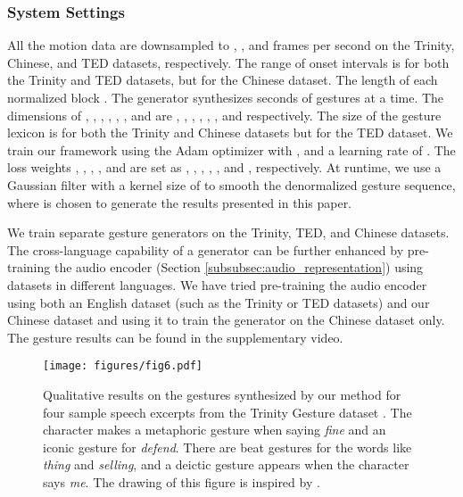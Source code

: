 \documentclass[acmtog,authorversion]{acmart}
\begin{document}
\subsubsection{System Settings}
All the motion data are downsampled to , , and  frames per second on the Trinity, Chinese, and TED datasets, respectively. The range of onset intervals  is   for both the Trinity and TED datasets, but  for the Chinese dataset. The length of each normalized block   . The generator synthesizes  seconds of gestures at a time. The dimensions of , , , , , , and  are , , , , , , and  respectively. The size of the gesture lexicon  is  for both the Trinity and Chinese datasets but  for the TED dataset. We train our framework using the Adam optimizer with ,  and a learning rate of . The loss weights , , , , and  are set as , , , , , and , respectively. At runtime, we use a Gaussian filter with a kernel size of  to smooth the denormalized gesture sequence, where  is chosen to generate the results presented in this paper.

We train separate gesture generators on the Trinity, TED, and Chinese datasets. The cross-language capability of a generator can be further enhanced by pre-training the audio encoder (Section \ref{subsubsec:audio_representation}) using datasets in different languages. We have tried pre-training the audio encoder using both an English dataset (such as the Trinity or TED datasets) and our Chinese dataset and using it to train the generator on the Chinese dataset only. The gesture results can be found in the supplementary video.

\begin{figure*}[t]
    \centering
    \texttt{[image: figures/fig6.pdf]}
    \caption{Qualitative results on the gestures synthesized by our method for four sample speech excerpts from the Trinity Gesture dataset \cite{ferstl2018investigating}. The character makes a metaphoric gesture when saying \emph{fine} and an iconic gesture for \emph{defend}. There are beat gestures for the words like \emph{thing} and \emph{selling}, and a deictic gesture appears when the character says \emph{me}. The drawing of this figure is inspired by \cite{yoon2020speech}.}
    \Description{}
    \label{fig:fig6}
\end{figure*}
\end{document}

